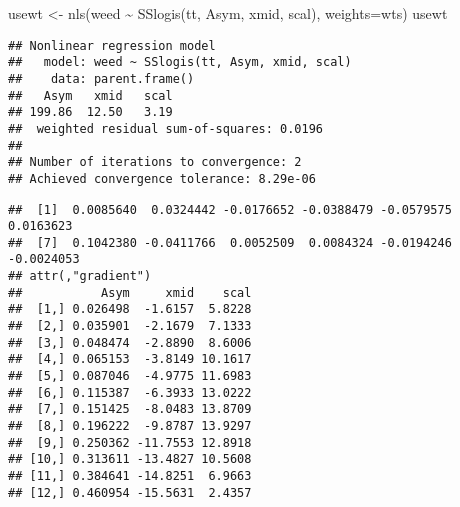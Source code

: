 \documentclass[
]{article}
\newenvironment{Shaded}{\begin{snugshade}}{\end{snugshade}}
\newcommand{\AttributeTok}[1]{\textcolor[rgb]{0.77,0.63,0.00}{#1}}
\newcommand{\CommentTok}[1]{\textcolor[rgb]{0.56,0.35,0.01}{\textit{#1}}}
\newcommand{\DecValTok}[1]{\textcolor[rgb]{0.00,0.00,0.81}{#1}}
\newcommand{\FunctionTok}[1]{\textcolor[rgb]{0.00,0.00,0.00}{#1}}
\newcommand{\NormalTok}[1]{#1}
\newcommand{\OtherTok}[1]{\textcolor[rgb]{0.56,0.35,0.01}{#1}}
\newcommand{\SpecialCharTok}[1]{\textcolor[rgb]{0.00,0.00,0.00}{#1}}
\begin{document}
\begin{Shaded}
\begin{Highlighting}[]
\NormalTok{usewt }\OtherTok{\textless{}{-}} \FunctionTok{nls}\NormalTok{(weed }\SpecialCharTok{\textasciitilde{}} \FunctionTok{SSlogis}\NormalTok{(tt, Asym, xmid, scal), }\AttributeTok{weights=}\NormalTok{wts)}
\NormalTok{usewt}
\end{Highlighting}
\end{Shaded}

\begin{verbatim}
## Nonlinear regression model
##   model: weed ~ SSlogis(tt, Asym, xmid, scal)
##    data: parent.frame()
##   Asym   xmid   scal 
## 199.86  12.50   3.19 
##  weighted residual sum-of-squares: 0.0196
## 
## Number of iterations to convergence: 2 
## Achieved convergence tolerance: 8.29e-06
\end{verbatim}

\begin{Shaded}
\end{Shaded}

\begin{verbatim}
##  [1]  0.0085640  0.0324442 -0.0176652 -0.0388479 -0.0579575  0.0163623
##  [7]  0.1042380 -0.0411766  0.0052509  0.0084324 -0.0194246 -0.0024053
## attr(,"gradient")
##           Asym     xmid    scal
##  [1,] 0.026498  -1.6157  5.8228
##  [2,] 0.035901  -2.1679  7.1333
##  [3,] 0.048474  -2.8890  8.6006
##  [4,] 0.065153  -3.8149 10.1617
##  [5,] 0.087046  -4.9775 11.6983
##  [6,] 0.115387  -6.3933 13.0222
##  [7,] 0.151425  -8.0483 13.8709
##  [8,] 0.196222  -9.8787 13.9297
##  [9,] 0.250362 -11.7553 12.8918
## [10,] 0.313611 -13.4827 10.5608
## [11,] 0.384641 -14.8251  6.9663
## [12,] 0.460954 -15.5631  2.4357
\end{verbatim}

\begin{Shaded}
\end{Shaded}
\end{document}
